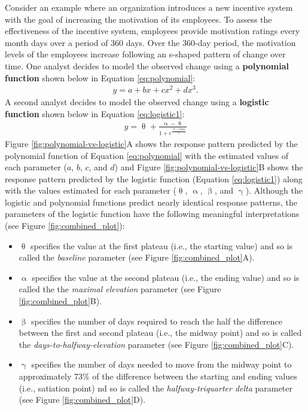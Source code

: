 \documentclass[
12pt, %
twoside,
english]{guelphthesis}
\theoremstyle{definition}
\theoremstyle{definition}
\theoremstyle{definition}
\theoremstyle{definition}
\theoremstyle{remark}
\begin{document}
Consider an example where an organization introduces a new incentive system with the goal of increasing the motivation of its employees. To assess the effectiveness of the incentive system, employees provide motivation ratings every month days over a period of 360 days. Over the 360-day period, the motivation levels of the employees increase following an s-shaped pattern of change over time. One analyst decides to model the observed change using a \textbf{polynomial function} shown below in Equation \ref{eq:polynomial}:
\begin{align}
  y = \mathit{a} + \mathit{b}x + \mathit{c}x^2 + \mathit{d}x^3.
  \label{eq:polynomial}
\end{align}
\noindent A second analyst decides to model the observed change using a \textbf{logistic function} shown below in Equation \ref{eq:logistic1}:
\begin{align}
  y = \uptheta + \frac{\upalpha - \uptheta}{1 + e^{\frac{\upbeta -time}{\upgamma}}}
  \label{eq:logistic1}
\end{align}
\noindent  Figure \ref{fig:polynomial-vs-logistic}A shows the response pattern predicted by the polynomial function of Equation \ref{eq:polynomial} with the estimated values of each parameter (\(a\), \(b\), \(c\), and \(d\)) and Figure \ref{fig:polynomial-vs-logistic}B shows the response pattern predicted by the logistic function (Equation \ref{eq:logistic1}) along with the values estimated for each parameter (\(\uptheta\), \(\upalpha\), \(\upbeta\), and \(\upgamma\)). Although the logistic and polynomial functions predict nearly identical response patterns, the parameters of the logistic function have the following meaningful interpretations (see Figure \ref{fig:combined_plot}):
\begin{itemize}
\tightlist
\item
  \(\uptheta\) specifies the value at the first plateau (i.e., the starting value) and so is called the \emph{baseline} parameter (see Figure \ref{fig:combined_plot}A).
\item
  \(\upalpha\) specifies the value at the second plateau (i.e., the ending value) and so is called the the \emph{maximal elevation} parameter (see Figure \ref{fig:combined_plot}B).
\item
  \(\upbeta\) specifies the number of days required to reach the half the difference between the first and second plateau (i.e., the midway point) and so is called the \emph{days-to-halfway-elevation} parameter (see Figure \ref{fig:combined_plot}C).
\item
  \(\upgamma\) specifies the number of days needed to move from the midway point to approximately 73\% of the difference between the starting and ending values (i.e., satiation point) nd so is called the \emph{halfway-triquarter delta} parameter (see Figure \ref{fig:combined_plot}D).
\end{itemize}
\end{document}
